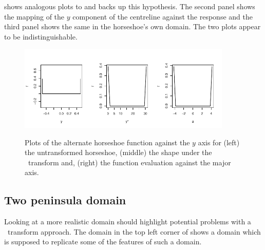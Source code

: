  shows analogous plots to  and backs up this hypothesis. The second panel shows the mapping of the $y$ component of the centreline against the response and the third panel shows the same in the horseshoe's own domain. The two plots appear to be indistinguishable.

\begin{figure}
\centering
\includegraphics[width=4in]{sc/figs/altcentrelinelineplots.pdf} \\
\caption{Plots of the alternate horseshoe function against the $y$ axis for (left) the untransformed horseshoe, (middle) the shape under the \sch\ transform and, (right) the function evaluation against the major axis.}
\label{altcentrelinelineplot}
\end{figure}

\subsection{Two peninsula domain}

Looking at a more realistic domain should highlight potential problems with a \sch\ transform approach. The domain in the top left corner of  shows a domain which is supposed to replicate some of the features of such a domain.

